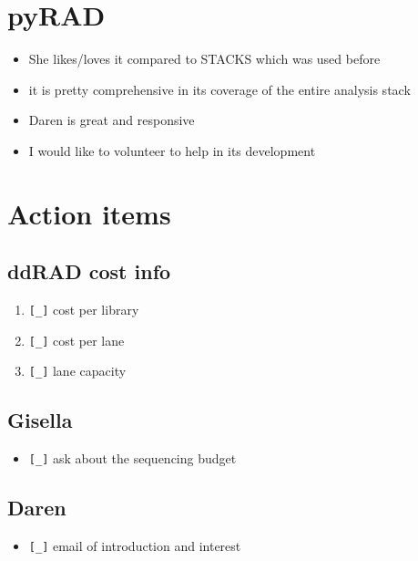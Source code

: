 \documentclass[letterpaper]{scrartcl}
\begin{document}
\section{pyRAD}\label{pyrad}

\begin{itemize}
\itemsep1pt\parskip0pt
\item
  She likes/loves it compared to STACKS which was used before
\item
  it is pretty comprehensive in its coverage of the entire analysis
  stack
\item
  Daren is great and responsive
\item
  I would like to volunteer to help in its development
\end{itemize}

\section{Action items}\label{action-items}

\subsection{ddRAD cost info}\label{ddrad-cost-info}

\begin{enumerate}
\def\labelenumi{\arabic{enumi}.}
\itemsep1pt\parskip0pt
\item
  \texttt{{[}\_{]}} cost per library
\item
  \texttt{{[}\_{]}} cost per lane
\item
  \texttt{{[}\_{]}} lane capacity
\end{enumerate}

\subsection{Gisella}\label{gisella}

\begin{itemize}
\itemsep1pt\parskip0pt
\item
  \texttt{{[}\_{]}} ask about the sequencing budget
\end{itemize}

\subsection{Daren}\label{daren}

\begin{itemize}
\itemsep1pt\parskip0pt
\item
  \texttt{{[}\_{]}} email of introduction and interest
\end{itemize}
\end{document}
